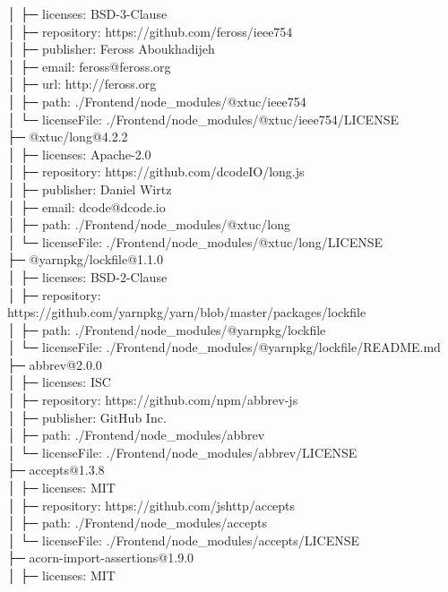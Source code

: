 │  ├─ licenses: BSD-3-Clause\\
│  ├─ repository: https://github.com/feross/ieee754\\
│  ├─ publisher: Feross Aboukhadijeh\\
│  ├─ email: feross@feross.org\\
│  ├─ url: http://feross.org\\
│  ├─ path: ./Frontend/node\_modules/@xtuc/ieee754\\
│  └─ licenseFile: ./Frontend/node\_modules/@xtuc/ieee754/LICENSE\\
├─ @xtuc/long@4.2.2\\
│  ├─ licenses: Apache-2.0\\
│  ├─ repository: https://github.com/dcodeIO/long.js\\
│  ├─ publisher: Daniel Wirtz\\
│  ├─ email: dcode@dcode.io\\
│  ├─ path: ./Frontend/node\_modules/@xtuc/long\\
│  └─ licenseFile: ./Frontend/node\_modules/@xtuc/long/LICENSE\\
├─ @yarnpkg/lockfile@1.1.0\\
│  ├─ licenses: BSD-2-Clause\\
│  ├─ repository: https://github.com/yarnpkg/yarn/blob/master/packages/lockfile\\
│  ├─ path: ./Frontend/node\_modules/@yarnpkg/lockfile\\
│  └─ licenseFile: ./Frontend/node\_modules/@yarnpkg/lockfile/README.md\\
├─ abbrev@2.0.0\\
│  ├─ licenses: ISC\\
│  ├─ repository: https://github.com/npm/abbrev-js\\
│  ├─ publisher: GitHub Inc.\\
│  ├─ path: ./Frontend/node\_modules/abbrev\\
│  └─ licenseFile: ./Frontend/node\_modules/abbrev/LICENSE\\
├─ accepts@1.3.8\\
│  ├─ licenses: MIT\\
│  ├─ repository: https://github.com/jshttp/accepts\\
│  ├─ path: ./Frontend/node\_modules/accepts\\
│  └─ licenseFile: ./Frontend/node\_modules/accepts/LICENSE\\
├─ acorn-import-assertions@1.9.0\\
│  ├─ licenses: MIT\\
